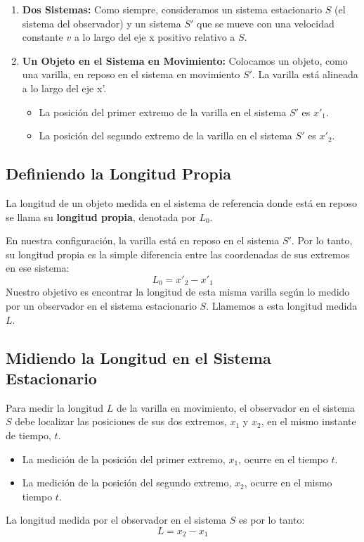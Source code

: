 \documentclass[11pt,a4paper]{article}
\begin{document}
\begin{enumerate}
    \item \textbf{Dos Sistemas:} Como siempre, consideramos un sistema estacionario $S$ (el sistema del observador) y un sistema $S'$ que se mueve con una velocidad constante $v$ a lo largo del eje x positivo relativo a $S$.

    \item \textbf{Un Objeto en el Sistema en Movimiento:} Colocamos un objeto, como una varilla, en reposo en el sistema en movimiento $S'$. La varilla está alineada a lo largo del eje x'.
    \begin{itemize}
        \item La posición del primer extremo de la varilla en el sistema $S'$ es $x'_1$.
        \item La posición del segundo extremo de la varilla en el sistema $S'$ es $x'_2$.
    \end{itemize}
\end{enumerate}

\subsection{Definiendo la Longitud Propia}

La longitud de un objeto medida en el sistema de referencia donde está en reposo se llama su \textbf{longitud propia}, denotada por $L_0$.

En nuestra configuración, la varilla está en reposo en el sistema $S'$. Por lo tanto, su longitud propia es la simple diferencia entre las coordenadas de sus extremos en ese sistema:
\[ L_0 = x'_2 - x'_1 \]
Nuestro objetivo es encontrar la longitud de esta misma varilla según lo medido por un observador en el sistema estacionario $S$. Llamemos a esta longitud medida $L$.

\subsection{Midiendo la Longitud en el Sistema Estacionario}

Para medir la longitud $L$ de la varilla en movimiento, el observador en el sistema $S$ debe localizar las posiciones de sus dos extremos, $x_1$ y $x_2$, en el mismo instante de tiempo, $t$.
\begin{itemize}
    \item La medición de la posición del primer extremo, $x_1$, ocurre en el tiempo $t$.
    \item La medición de la posición del segundo extremo, $x_2$, ocurre en el mismo tiempo $t$.
\end{itemize}
La longitud medida por el observador en el sistema $S$ es por lo tanto:
\[ L = x_2 - x_1 \]
\end{document}
